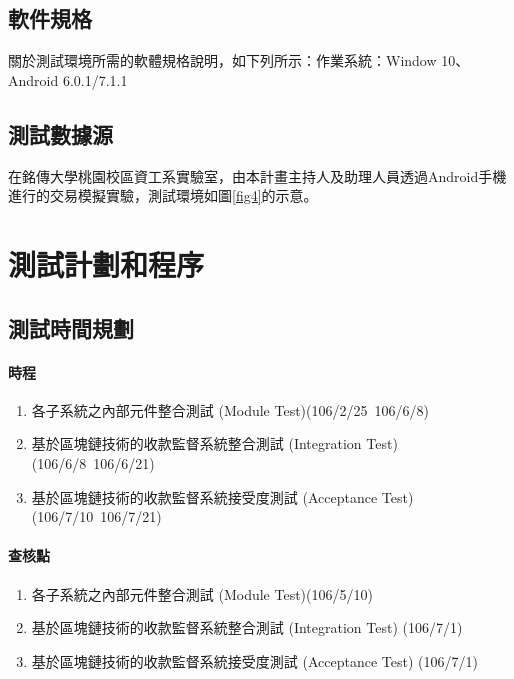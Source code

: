  		\subsection{軟件規格}
 		關於測試環境所需的軟體規格說明，如下列所示：作業系統：Window 10、Android 6.0.1/7.1.1

 		\subsection{測試數據源}
 		在銘傳大學桃園校區資工系實驗室，由本計畫主持人及助理人員透過Android手機進行的交易模擬實驗，測試環境如圖\ref{fig4}的示意。

 	\section{測試計劃和程序}

 		\subsection{測試時間規劃}

 		\paragraph{時程}

 			\begin{enumerate}
 				\item 各子系統之內部元件整合測試 (Module Test)(106/2/25~106/6/8)
 				\item 基於區塊鏈技術的收款監督系統整合測試 (Integration Test) (106/6/8~106/6/21)
 				\item 基於區塊鏈技術的收款監督系統接受度測試 (Acceptance Test) (106/7/10~106/7/21)
			\end{enumerate}

		\paragraph{查核點}

			\begin{enumerate}
 				\item 各子系統之內部元件整合測試 (Module Test)(106/5/10)
 				\item 基於區塊鏈技術的收款監督系統整合測試 (Integration Test) (106/7/1)
 				\item 基於區塊鏈技術的收款監督系統接受度測試 (Acceptance Test) (106/7/1)
 			\end{enumerate}

